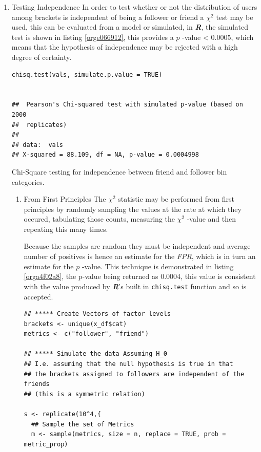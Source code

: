 \documentclass[11pt]{article}
\begin{document}
\begin{enumerate}
\item Testing Independence
\label{sec:org15b085a}
In order to test whether or not the distribution of users among brackets is
independent of being a follower or friend a \(\chi^{2}\) test may be used, this
can be evaluated from a model or simulated, in \textbf{\emph{R}}, the simulated test is
shown in listing \ref{orge066912}, this provides a \(p\) -value < 0.0005, which means that the hypothesis of independence may be rejected with a high degree of certainty.

\begin{listing}[htbp]
\begin{verbatim}
chisq.test(vals, simulate.p.value = TRUE)


## 	Pearson's Chi-squared test with simulated p-value (based on 2000
## 	replicates)
##
## data:  vals
## X-squared = 88.109, df = NA, p-value = 0.0004998
\end{verbatim}
\caption{\label{orge066912}Chi-Square testing for independence between friend and follower bin categories.}
\end{listing}

\begin{enumerate}
\item From First Principles
\label{sec:org4c1020d}
The \(\chi^{2}\) statistic may be performed from first principles by randomly
sampling the values at the rate at which they occured, tabulating those counts, measuring the \(\chi^{2}\) -value and then repeating this many times.

Because the samples are random they must be independent and average number of
positives is hence an estimate for the \emph{FPR}, which is in turn an estimate for
the \(p\) -value. This technique is demonstrated in listing \ref{orga4f02a8}, the p-value
being returned as 0.0004, this value is consistent with the value produced by
\textbf{\emph{R}}'s built in \texttt{chisq.test} function and so is accepted.

\begin{listing}[htbp]
\begin{verbatim}
## ***** Create Vectors of factor levels
brackets <- unique(x_df$cat)
metrics <- c("follower", "friend")

## ***** Simulate the data Assuming H_0
## I.e. assuming that the null hypothesis is true in that
## the brackets assigned to followers are independent of the friends
## (this is a symmetric relation)

s <- replicate(10^4,{
  ## Sample the set of Metrics
  m <- sample(metrics, size = n, replace = TRUE, prob = metric_prop)


\end{verbatim}
\end{listing}
\end{enumerate}
\end{enumerate}
\end{document}
